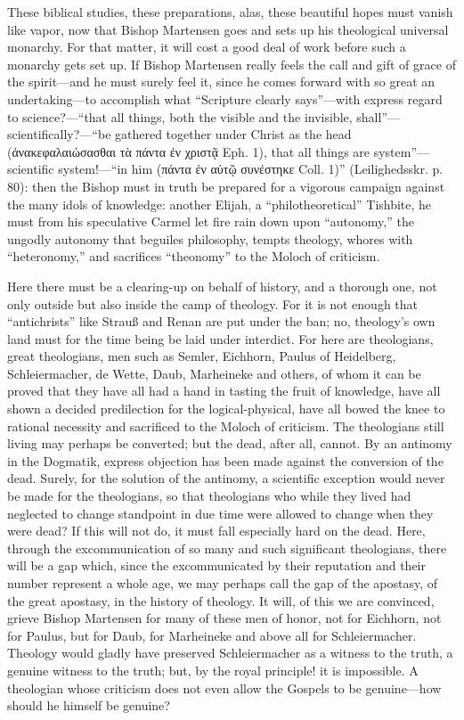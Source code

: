\documentclass[12pt]{book}
\newcommand{\opage}[1]{\marginnote{\footnotesize\textit{[#1]}}}
\begin{document}
These biblical studies, these preparations, alas, these beautiful hopes must vanish like vapor, now that Bishop Martensen goes and sets up his theological universal monarchy. For that matter, it will cost a good deal of work before such a monarchy gets set up. If Bishop Martensen really feels the call and gift of grace of the spirit---and he must surely feel it, since he comes forward with so great an undertaking---to accomplish what ``Scripture clearly says''---with express regard to science?---``that all things, both the visible and the invisible, shall''---scientifically?---``be gathered together under Christ as the head (ἀνακεφαλαιώσασθαι τὰ πάντα ἐν χριστᾷ Eph. 1), that all things are system''---
\opage{65}\setcounter{footnote}{0}%
scientific system!---``in him (πάντα ἐν αὐτῷ συνέστηκε Coll. 1)'' (Leilighedsskr. p. 80): then the Bishop must in truth be prepared for a vigorous campaign against the many idols of knowledge: another Elijah, a ``philotheoretical'' Tishbite, he must from his speculative Carmel let fire rain down upon ``autonomy,'' the ungodly autonomy that beguiles philosophy, tempts theology, whores with ``heteronomy,'' and sacrifices ``theonomy'' to the Moloch of criticism.

Here there must be a clearing-up on behalf of history, and a thorough one, not only outside but also inside the camp of theology. For it is not enough that ``antichrists'' like Strauß and Renan are put under the ban; no, theology's own land must for the time being be laid under interdict. For here are theologians, great theologians, men such as Semler, Eichhorn, Paulus of Heidelberg, Schleiermacher, de Wette, Daub, Marheineke and others, of whom it can be proved that they have all had a hand in tasting the fruit of knowledge, have all shown a decided predilection for the logical-physical, have all bowed the knee to rational necessity and sacrificed to the Moloch of criticism. The theologians still living may perhaps be converted; but the dead, after all, cannot. By an antinomy in the Dogmatik, express objection has been made against the conversion of the dead. Surely, for the solution of the antinomy, a scientific exception would never be made for the theologians, so that theologians who while they lived had neglected to change standpoint in due time were allowed to change when they were dead? If this will not do, it must fall especially hard on the dead. Here, through the excommunication of so many and such significant theologians, there will be a gap which, since the excommunicated by their reputation and their number represent a whole age, we may perhaps call the gap of the apostasy, of the great apostasy, in the history of theology. It will, of this we are convinced, grieve Bishop Martensen for many of these men of honor, not for Eichhorn, not for Paulus, but for Daub, for Marheineke
\opage{66}\setcounter{footnote}{0}%
and above all for Schleiermacher. Theology would gladly have preserved Schleiermacher as a witness to the truth, a genuine witness to the truth; but, by the royal principle! it is impossible. A theologian whose criticism does not even allow the Gospels to be genuine---how should he himself be genuine?
\end{document}

